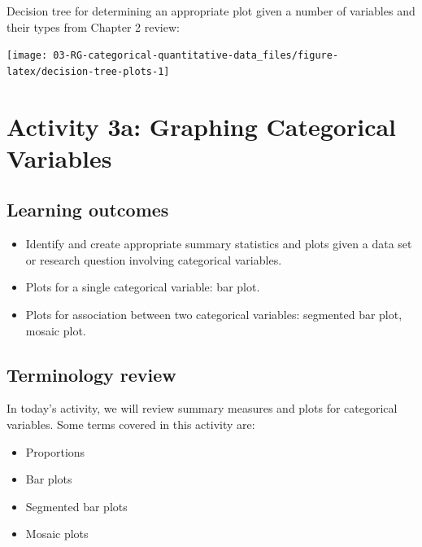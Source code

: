 \documentclass[
]{report}
\newcommand{\rgs}{\vspace{12pt}} %
\begin{document}
\rgs
\newpage

Decision tree for determining an appropriate plot given a number of variables and their types from Chapter 2 review:

\begin{center}\texttt{[image: 03-RG-categorical-quantitative-data\_files/figure-latex/decision-tree-plots-1]} \end{center}

\newpage

\hypertarget{activity-3a-graphing-categorical-variables}{%
\section{Activity 3a: Graphing Categorical Variables}\label{activity-3a-graphing-categorical-variables}}


\hypertarget{learning-outcomes-4}{%
\subsection{Learning outcomes}\label{learning-outcomes-4}}

\begin{itemize}
\item
  Identify and create appropriate summary statistics and plots given a data set or research question involving categorical variables.
\item
  Plots for a single categorical variable: bar plot.
\item
  Plots for association between two categorical variables:
  segmented bar plot, mosaic plot.
\end{itemize}

\hypertarget{terminology-review-4}{%
\subsection{Terminology review}\label{terminology-review-4}}

In today's activity, we will review summary measures and plots for categorical variables. Some terms covered in this activity are:

\begin{itemize}
\item
  Proportions
\item
  Bar plots
\item
  Segmented bar plots
\item
  Mosaic plots
\end{itemize}
\end{document}
